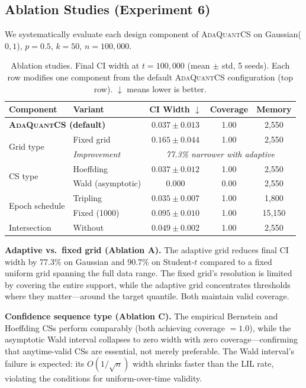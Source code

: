 \documentclass{article}
\newcommand{\ours}{\textsc{AdaQuantCS}}
\begin{document}
\subsection{Ablation Studies (Experiment 6)}

We systematically evaluate each design component of \ours{} on Gaussian($0,1$), $p = 0.5$, $k = 50$, $n = 100{,}000$.

\begin{table}[t]
\caption{Ablation studies. Final CI width at $t = 100{,}000$ (mean $\pm$ std, 5 seeds). Each row modifies one component from the default \ours{} configuration (top row). $\downarrow$ means lower is better.}
\label{tab:ablation}
\centering
\begin{tabular}{llccc}
\toprule
Component & Variant & CI Width $\downarrow$ & Coverage & Memory \\
\midrule
\multicolumn{2}{l}{\textbf{\ours{} (default)}} & $\mathbf{0.037 \pm 0.013}$ & 1.00 & 2{,}550 \\
\midrule
\multirow{2}{*}{Grid type} & Fixed grid & $0.165 \pm 0.044$ & 1.00 & 2{,}550 \\
                           & \textit{Improvement} & \multicolumn{3}{c}{\textit{77.3\% narrower with adaptive}} \\
\midrule
\multirow{2}{*}{CS type}   & Hoeffding & $0.037 \pm 0.012$ & 1.00 & 2{,}550 \\
                           & Wald (asymptotic) & $0.000$ & 0.00 & 2{,}550 \\
\midrule
\multirow{2}{*}{Epoch schedule} & Tripling & $0.035 \pm 0.007$ & 1.00 & 1{,}800 \\
                                & Fixed (1000) & $0.095 \pm 0.010$ & 1.00 & 15{,}150 \\
\midrule
\multirow{1}{*}{Intersection} & Without & $0.049 \pm 0.002$ & 1.00 & 2{,}550 \\
\bottomrule
\end{tabular}
\end{table}

\textbf{Adaptive vs.\ fixed grid (Ablation A).} The adaptive grid reduces final CI width by 77.3\% on Gaussian and 90.7\% on Student-$t$ compared to a fixed uniform grid spanning the full data range. The fixed grid's resolution is limited by covering the entire support, while the adaptive grid concentrates thresholds where they matter---around the target quantile. Both maintain valid coverage.

\textbf{Confidence sequence type (Ablation C).} The empirical Bernstein and Hoeffding CSs perform comparably (both achieving coverage $= 1.0$), while the asymptotic Wald interval collapses to zero width with zero coverage---confirming that anytime-valid CSs are essential, not merely preferable. The Wald interval's failure is expected: its $O(1/\sqrt{n})$ width shrinks faster than the LIL rate, violating the conditions for uniform-over-time validity.
\end{document}
